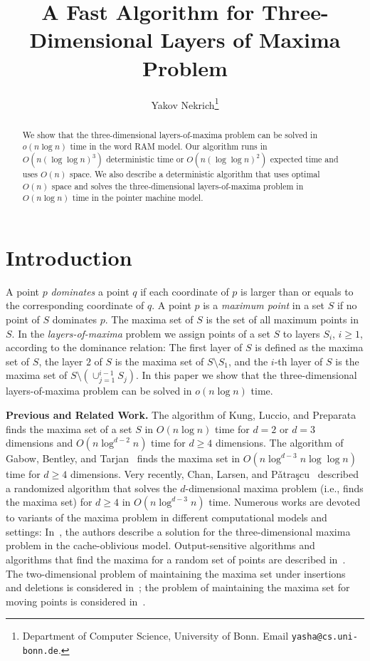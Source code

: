 \documentclass[10pt]{llncs}
\begin{document}
\title{ A Fast Algorithm for Three-Dimensional Layers of Maxima
 Problem}
\author{Yakov Nekrich\thanks{Department of Computer Science, University of Bonn. Email {\tt yasha@cs.uni-bonn.de}.}
}
\institute{}
\maketitle
\begin{abstract}
  We show that the three-dimensional layers-of-maxima problem can be solved 
in $o(n\log n)$ time in the word RAM model. 
  Our  algorithm runs  in $O(n(\log \log n)^3)$ deterministic time or 
$O(n(\log\log n)^2)$ expected time and uses $O(n)$ space.
  We also describe a deterministic  algorithm that uses optimal $O(n)$ space and solves 
  the three-dimensional layers-of-maxima problem in $O(n\log n)$ time 
  in the pointer machine model. 
\end{abstract} 
\thispagestyle{empty}

\section{Introduction}
A point $p$ \emph{dominates} a point $q$ if each coordinate of $p$ 
is larger than or equals to the corresponding coordinate of $q$. 
A point $p$ is a \emph{maximum point} in a set $S$ if no point of $S$ 
dominates $p$. The maxima set of $S$ is the set of all maximum points 
in $S$. 
In the {\em layers-of-maxima} problem we assign points of a set $S$ 
to layers $S_i$, $i\geq 1$,  according to the dominance relation: 
The first layer of $S$ is defined as the maxima set of $S$, the 
layer $2$ of $S$ is the maxima set of $S\setminus S_1$, 
and the $i$-th layer of 
$S$ is the maxima set of $S\setminus (\cup_{j=1}^{i-1} S_j)$. 
In this paper we show that the three-dimensional layers-of-maxima 
problem can be solved in $o(n\log n)$ time. 

{\bf Previous and Related Work.} 
The algorithm of Kung, Luccio, and Preparata~\cite{KLP75} finds the 
maxima set of a set $S$ in 
$O(n\log n)$ time for $d=2$ or $d=3$ dimensions and 
$O(n\log^{d-2} n)$ time for $d\geq 4$ dimensions.
The  algorithm of Gabow, Bentley, and Tarjan~\cite{GBT84} finds the 
maxima set in  $O(n\log^{d-3}n\log\log n)$ time 
for $d\geq 4$ dimensions. 
Very recently, Chan, Larsen, and P\v{a}tra\c{s}cu~\cite{CLP11} described a
randomized  algorithm that  solves  the $d$-dimensional 
maxima problem (i.e., finds the maxima set) for $d\geq 4$ in 
$O(n\log^{d-3}n)$ time.
Numerous works are devoted to variants of the 
maxima problem in 
different computational models and settings:
In~\cite{BF02}, the authors describe a solution for the three-dimensional 
maxima problem in the cache-oblivious model.
Output-sensitive algorithms and algorithms  that find the maxima 
for a random set of points are described in~\cite{BCL90,Cl94,G94,KS85}.
The two-dimensional problem of maintaining the maxima set under insertions
 and deletions 
is considered in~\cite{K94}; the problem of maintaining the maxima set 
for moving points is considered in~\cite{FGT92}.
\end{document}
